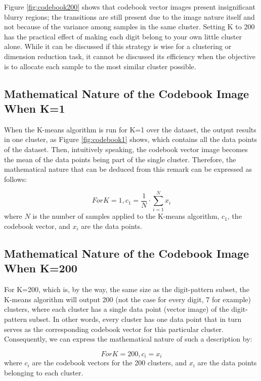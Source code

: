 \documentclass{article}
\begin{document}
Figure \ref{fig:codebook200} shows that codebook vector images present insignificant blurry regions; the transitions are still present due to the image nature itself and not because of the variance among samples in the same cluster. Setting K to 200 has the practical effect of making each digit belong to your own little cluster alone. While it can be discussed if this strategy is wise for a clustering or dimension reduction task, it cannot be discussed its efficiency when the objective is to allocate each sample to the most similar cluster possible.

\subsection{Mathematical Nature of the Codebook Image When K=1}

When the K-means algorithm is run for K=1 over the dataset, the output results in one cluster, as Figure \ref{fig:codebook1} shows, which contains all the data points of the dataset. Then, intuitively speaking, the codebook vector image becomes the mean of the data points being part of the single cluster. Therefore, the mathematical nature that can be deduced from this remark can be expressed as follows:

\begin{equation}
 For K = 1, c_{1} = \frac{1}{N} \cdot \sum_{i=1}^N x_{i}
\end{equation}
where $N$ is the number of samples applied to the K-means algorithm, $c_{1}$, the codebook vector, and $x_{i}$ are the data points.

\subsection{Mathematical Nature of the Codebook Image When K=200}

For K=200, which is, by the way, the same size as the digit-pattern subset, the K-means algorithm will output 200 (not the case for every digit, 7 for example) clusters, where each cluster has a single data point (vector image) of the digit-pattern subset. In other words, every cluster has one data point that in turn serves as the corresponding codebook vector for this particular cluster. Consequently, we can express the mathematical nature of such a description by:

\begin{equation}
 For K = 200, c_{i} =  x_{i}
\end{equation}
where $c_{i}$ are the codebook vectors for the 200 clusters, and $x_{i}$ are the data points belonging to each cluster.
\end{document}
